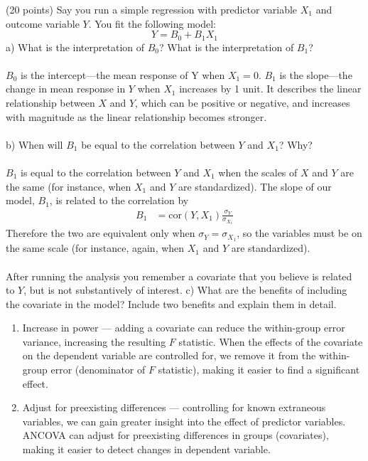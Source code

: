 \documentclass[onecolumn,10pt]{jhwhw}
\begin{document}
\clearpage
\problem{}%
(20 points) Say you run a simple regression with predictor variable $X_1$ and outcome variable $Y$. You fit the following model:
                $$Y = B_0 + B_1 X_1$$
a) What is the interpretation of $B_0$? What is the interpretation of $B_1$?\\
\\
$B_0$ is the intercept---the mean response of Y when $X_1 = 0$. $B_1$ is the slope---the change in mean response in $Y$ when $X_1$ increases by 1 unit. It describes the linear relationship between $X$ and $Y$, which can be positive or negative, and increases with magnitude as the linear relationship becomes stronger.\\
\\
b) When will $B_1$ be equal to the correlation between $Y$ and $X_1$? Why?\\
\\
$B_1$ is equal to the correlation between $Y$ and $X_1$ when the scales of $X$ and $Y$ are the same (for instance, when $X_1$ and $Y$ are standardized).
The slope of our model, $B_1$, is related to the correlation by
\begin{align*}
B_1 &= \mbox{cor}(Y, X_1) \frac{\sigma_Y}{\sigma_{X_1}}
\end{align*}
Therefore the two are equivalent only when $\sigma_{Y} = \sigma_{X_1}$, so the variables must be on the same scale (for instance, again, when $X_1$ and $Y$ are standardized).\\
\\
After running the analysis you remember a covariate that you believe is related to $Y$, but is not substantively of interest.
c) What are the benefits of including the covariate in the model? Include two benefits and explain them in detail.
\begin{enumerate}
\item Increase in power --- adding a covariate can reduce the within-group error variance, increasing the resulting $F$ statistic. When the effects of the covariate on the dependent variable are controlled for, we remove it from the within-group error (denominator of $F$ statistic), making it easier to find a significant effect.
\item Adjust for preexisting differences --- controlling for known extraneous variables, we can gain greater insight into the effect of predictor variables. ANCOVA can adjust for preexisting differences in groups (covariates), making it easier to detect changes in dependent variable.
\end{enumerate}
\end{document}
